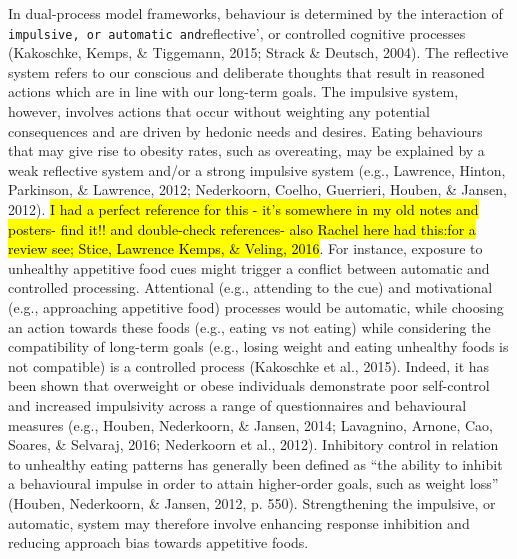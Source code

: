 \documentclass[man,floatsintext]{apa6}
\begin{document}
In dual-process model frameworks, behaviour is determined by the interaction of \texttt{impulsive\textquotesingle{},\ or\ automatic\ and}reflective', or controlled cognitive processes (Kakoschke, Kemps, \& Tiggemann, 2015; Strack \& Deutsch, 2004). The reflective system refers to our conscious and deliberate thoughts that result in reasoned actions which are in line with our long-term goals. The impulsive system, however, involves actions that occur without weighting any potential consequences and are driven by hedonic needs and desires. Eating behaviours that may give rise to obesity rates, such as overeating, may be explained by a weak reflective system and/or a strong impulsive system (e.g., Lawrence, Hinton, Parkinson, \& Lawrence, 2012; Nederkoorn, Coelho, Guerrieri, Houben, \& Jansen, 2012). \hl{I had a perfect reference for this - it's somewhere in my old notes and posters- find it!! and double-check references- also Rachel here had this:for a review see; Stice, Lawrence Kemps, \& Veling, 2016}. For instance, exposure to unhealthy appetitive food cues might trigger a conflict between automatic and controlled processing. Attentional (e.g., attending to the cue) and motivational (e.g., approaching appetitive food) processes would be automatic, while choosing an action towards these foods (e.g., eating vs not eating) while considering the compatibility of long-term goals (e.g., losing weight and eating unhealthy foods is not compatible) is a controlled process (Kakoschke et al., 2015). Indeed, it has been shown that overweight or obese individuals demonstrate poor self-control and increased impulsivity across a range of questionnaires and behavioural measures (e.g., Houben, Nederkoorn, \& Jansen, 2014; Lavagnino, Arnone, Cao, Soares, \& Selvaraj, 2016; Nederkoorn et al., 2012). Inhibitory control in relation to unhealthy eating patterns has generally been defined as \enquote{the ability to inhibit a behavioural impulse in order to attain higher-order goals, such as weight loss} (Houben, Nederkoorn, \& Jansen, 2012, p. 550). Strengthening the impulsive, or automatic, system may therefore involve enhancing response inhibition and reducing approach bias towards appetitive foods.

\par
\end{document}
